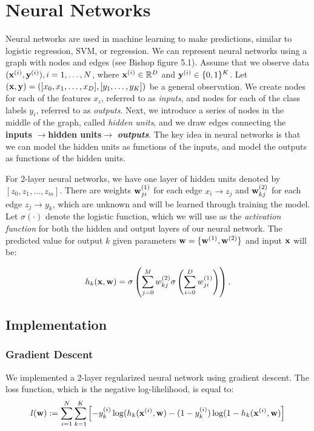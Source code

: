 
\section{Neural Networks}\label{sec:neural_networks}

Neural networks are used in machine learning to make predictions, similar to logistic regression, SVM, or regression.  We can represent neural networks using a graph with nodes and edges (see Bishop figure 5.1).  Assume that we observe data $(\boldsymbol{\mathbf{x}}^{(i)},\boldsymbol{\mathbf{y}}^{(i)}), i = 1, \ldots, N$,  where $\boldsymbol{\mathbf{x}}^{(i)} \in \mathbb{R}^D$ and $\boldsymbol{\mathbf{y}}^{(i)} \in \{0,1\}^K$.  Let $(\boldsymbol{\mathbf{x}},\boldsymbol{\mathbf{y}}) = ([x_0, x_1, \ldots, x_D],[y_1, \ldots, y_K])$ be a general observation.  We create nodes for each of the features $x_i$, referred to as \emph{inputs}, and nodes for each of the class labels $y_i$, referred to as \emph{outputs}.  Next, we introduce a series of nodes in the middle of the graph, called \emph{hidden units}, and we draw edges connecting the {\bf inputs} $\rightarrow ${\bf hidden units}$ \rightarrow$ \emph{\bf outputs}.  The key idea in neural networks is that we can model the hidden units as functions of the inputs, and model the outputs as functions of the hidden units.   

For 2-layer neural networks, we have one layer of hidden units denoted by $[z_0, z_1,\ldots, z_m]$.   There are weights $\boldsymbol{\mathbf{w}}^{(1)}_{ji}$ for each edge $x_i \rightarrow z_j$ and $\boldsymbol{\mathbf{w}}^{(2)}_{kj}$ for each edge $z_j \rightarrow y_k$, which are unknown and will be learned through training the model.  Let $\sigma(\cdot)$ denote the logistic function, which we will use as the \emph{activation function} for both the hidden and output layers of our neural network.  The predicted value for output $k$ given parameters $\boldsymbol{\mathbf{w}} = \{\boldsymbol{\mathbf{w}}^{(1)}, \boldsymbol{\mathbf{w}}^{(2)}\}$ and input $\boldsymbol{\mathbf{x}}$ will be:

\begin{equation}
h_{k}(\boldsymbol{\mathbf{x}},\boldsymbol{\mathbf{w}}) = \sigma\left(\sum_{j=0}^{M} w^{(2)}_{kj} \sigma\left(\sum_{i=0}^{D} w^{(1)}_{ji}\right)\right).
\end{equation}

\subsection{Implementation}

\subsubsection{Gradient Descent}
We implemented a 2-layer regularized neural network using gradient descent.  The loss function, which is the negative log-likelihood, is equal to:
\begin{equation}
l(\boldsymbol{\mathbf{w}}) := \sum_{i=1}^{N} \sum_{k=1}^{K} \left[ -y_k^{(i)} \log(h_{k}(\boldsymbol{\mathbf{x}}^{(i)}, \boldsymbol{\mathbf{w}}) - (1-y_k^{(i)}) \log(1 - h_{k}(\boldsymbol{\mathbf{x}}^{(i)}, \boldsymbol{\mathbf{w}})\right]
\end{equation}

